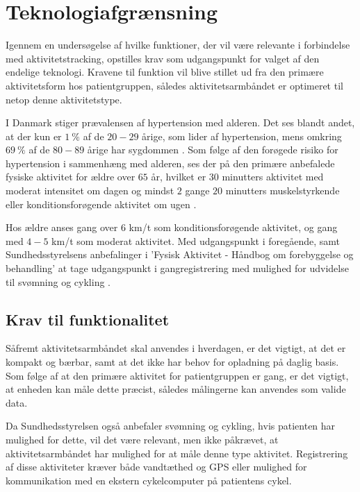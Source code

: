 \section{Teknologiafgrænsning} \label{afgraensning_tek}

Igennem en undersøgelse af hvilke funktioner, der vil være relevante i forbindelse med aktivitetstracking, opstilles krav som udgangspunkt for valget af den endelige teknologi. Kravene til funktion vil blive stillet ud fra den primære aktivitetsform hos patientgruppen, således aktivitetsarmbåndet er optimeret til netop denne aktivitetstype.

I Danmark stiger prævalensen af hypertension med alderen. Det ses blandt andet, at der kun er $1~\%$ af de $20-29$ årige, som lider af hypertension, mens omkring $69~\%$ af de $80-89$ årige har sygdommen \citep{olsen2015}. Som følge af den forøgede risiko for hypertension i sammenhæng med alderen, ses der på den primære anbefalede fysiske aktivitet for ældre over $65$ år, hvilket er $30$ minutters aktivitet med moderat intensitet om dagen og mindst $2$ gange $20$ minutters muskelstyrkende eller konditionsforøgende aktivitet om ugen \citep{pedersen2011}.

Hos ældre anses gang over $6$ km/t som konditionsforøgende aktivitet, og gang med $4-5$ km/t som moderat aktivitet. Med udgangspunkt i foregående, samt Sundhedsstyrelsens anbefalinger i 'Fysisk Aktivitet - Håndbog om forebyggelse og behandling' at tage udgangspunkt i gangregistrering med mulighed for udvidelse til svømning og cykling \citep{pedersen2011}.

\subsection{Krav til funktionalitet}

Såfremt aktivitetsarmbåndet skal anvendes i hverdagen, er det vigtigt, at det er kompakt og bærbar, samt at det ikke har behov for opladning på daglig basis. Som følge af at den primære aktivitet for patientgruppen er gang, er det vigtigt, at enheden kan måle dette præcist, således målingerne kan anvendes som valide data. 

Da Sundhedsstyrelsen også anbefaler svømning og cykling, hvis patienten har mulighed for dette, vil det være relevant, men ikke påkrævet, at aktivitetsarmbåndet har mulighed for at måle denne type aktivitet. Registrering af disse aktiviteter kræver både vandtæthed og GPS eller mulighed for kommunikation med en ekstern cykelcomputer på patientens cykel.

